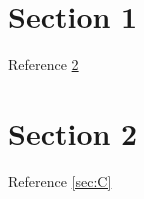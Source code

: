 \documentclass{article}
\begin{document}
\section{Section 1}\label{sec:A}
Reference \ref{sec:B}
\section{Section 2}\label{sec:B}
Reference \ref{sec:C}
\end{document}
